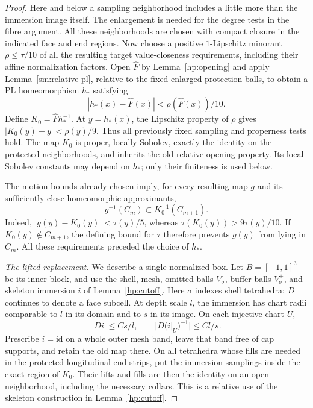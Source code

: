 \begin{proof}
Here and below a sampling neighborhood includes a little more than
the immersion image itself.  The enlargement is needed for the
degree tests in the fibre argument.  All these neighborhoods are
chosen with compact closure in the indicated face and end regions.
Now choose a positive $1$-Lipschitz minorant $\rho\leq\tau/10$ of
all the resulting target value-closeness requirements, including their
affine normalization factors.  Open $\widehat F$ by
Lemma~\ref{hp:opening} and apply Lemma~\ref{sm:relative-pl}, relative
to the fixed enlarged protection balls, to obtain a PL homeomorphism
$h_*$ satisfying
\[
 |h_*(x)-\widehat F(x)|<\rho(\widehat F(x))/10.
\]
Define $K_0=\widehat Fh_*^{-1}$.  At $y=h_*(x)$, the Lipschitz
property of $\rho$ gives
$|K_0(y)-y|<\rho(y)/9$.  Thus all previously fixed sampling and
properness tests hold.  The map $K_0$ is proper, locally Sobolev,
exactly the identity on the protected neighborhoods, and inherits
the old relative opening property.  Its local Sobolev constants may
depend on $h_*$; only their finiteness is used below.

The motion bounds already chosen imply, for every resulting map $g$
and its sufficiently close homeomorphic approximants,
\begin{equation}\label{qt:central-proper-localization}
 g^{-1}(C_m)\subset K_0^{-1}(C_{m+1}).
\end{equation}
Indeed, $|g(y)-K_0(y)|<\tau(y)/5$, whereas
$\tau(K_0(y))>9\tau(y)/10$.  If $K_0(y)\notin C_{m+1}$, the defining
bound for $\tau$ therefore prevents $g(y)$ from lying in $C_m$.
All these requirements preceded the choice of $h_*$.

\emph{The lifted replacement.}
We describe a single normalized box.  Let $B=[-1,1]^3$ be its inner
block, and use the shell, mesh, omitted balls $V_{\sigma}$, buffer balls
$V_{\sigma}^+$, and skeleton immersion $i$ of Lemma~\ref{hp:cutoff}.
Here $\sigma$ indexes shell tetrahedra; $D$ continues to denote a
face subcell.  At depth scale $l$, the immersion has chart radii
comparable to $l$ in its domain
and to $s$ in its image.  On each injective chart $U$,
\[
 |Di|\le C s/l,\qquad |D(i|_U)^{-1}|\le C l/s.
\]
Prescribe $i=\mathrm{id}$ on a whole outer mesh band, leave that
band free of cap supports, and retain the old map there.  On all
tetrahedra whose fills are needed in the protected longitudinal end
strips, put the immersion samplings inside the exact region of
$K_0$.  Their lifts and fills are then the identity on an open
neighborhood, including the necessary collars.  This is a relative
use of the skeleton construction in Lemma~\ref{hp:cutoff}.


\end{proof}
